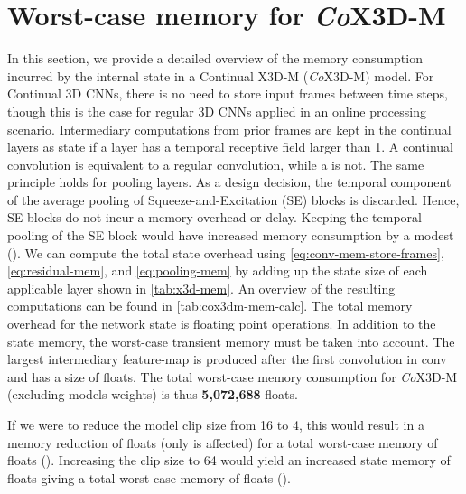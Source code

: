 \documentclass[runningheads]{llncs}
\begin{document}
\section{Worst-case memory for \textit{Co}X3D-M}
In this section, we provide a detailed overview of the memory consumption incurred by the internal state in a Continual X3D-M (\textit{Co}X3D-M) model.
For Continual 3D CNNs, there is no need to store input frames between time steps, though this is the case for regular 3D CNNs applied in an online processing scenario. 
Intermediary computations from prior frames are kept in the continual layers as state if a layer has a temporal receptive field larger than 1. 
A continual  convolution is equivalent to a regular convolution, while a  is not. 
The same principle holds for pooling layers. 
As a design decision, the temporal component of the average pooling of Squeeze-and-Excitation (SE) blocks is discarded. Hence, SE blocks do not incur a memory overhead or delay. 
Keeping the temporal pooling of the SE block would have increased memory consumption by a modest  ().
We can compute the total state overhead using \cref{eq:conv-mem-store-frames}, \cref{eq:residual-mem}, and \cref{eq:pooling-mem} by adding up the state size of each applicable layer shown in \cref{tab:x3d-mem}.
An overview of the resulting computations can be found in \cref{tab:cox3dm-mem-calc}. 
The total memory overhead for the network state is  floating point operations.
In addition to the state memory, the worst-case transient memory must be taken into account. 
The largest intermediary feature-map is produced after the first convolution in conv and has a size of  floats.
The total worst-case memory consumption for \textit{Co}X3D-M (excluding models weights) is thus \textbf{5,072,688} floats.

If we were to reduce the model clip size from 16 to 4, this would result in a memory reduction of  floats (only  is affected) for a total worst-case memory of  floats (). 
Increasing the clip size to 64 would yield an increased state memory of  floats giving a total worst-case memory of  floats ().
\end{document}
